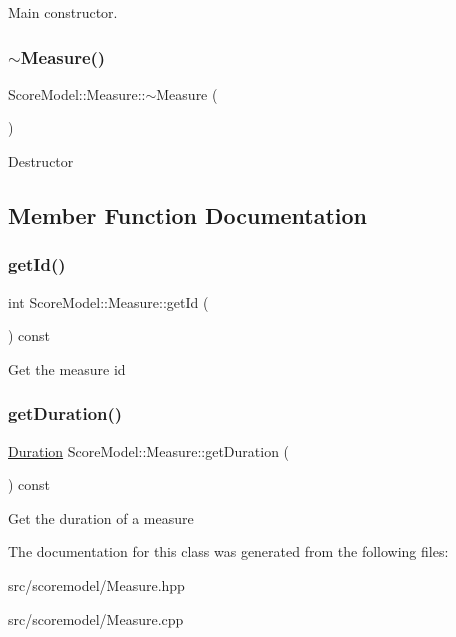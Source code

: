 Main constructor. \mbox{\label{classScoreModel_1_1Measure_a6b238b9003746affba14269356f14417}} 
\subsubsection{\texorpdfstring{$\sim$Measure()}{~Measure()}}
{\footnotesize\ttfamily Score\+Model\+::\+Measure\+::$\sim$\+Measure (\begin{DoxyParamCaption}{ }\end{DoxyParamCaption})}

Destructor 

\subsection{Member Function Documentation}
\mbox{\label{classScoreModel_1_1Measure_a659c3c98b641f9cef1f3e99a3a38a502}} 
\subsubsection{\texorpdfstring{getId()}{getId()}}
{\footnotesize\ttfamily int Score\+Model\+::\+Measure\+::get\+Id (\begin{DoxyParamCaption}{ }\end{DoxyParamCaption}) const\hspace{0.3cm}{\ttfamily [inline]}}

Get the measure id \mbox{\label{classScoreModel_1_1Measure_abffe1faa56b382dea4a8869cde03e8ba}} 
\subsubsection{\texorpdfstring{getDuration()}{getDuration()}}
{\footnotesize\ttfamily \mbox{\hyperlink{classScoreModel_1_1Duration}{Duration}} Score\+Model\+::\+Measure\+::get\+Duration (\begin{DoxyParamCaption}{ }\end{DoxyParamCaption}) const\hspace{0.3cm}{\ttfamily [inline]}}

Get the duration of a measure 

The documentation for this class was generated from the following files\+:\begin{DoxyCompactItemize}
\item 
src/scoremodel/Measure.\+hpp\item 
src/scoremodel/Measure.\+cpp\end{DoxyCompactItemize}
